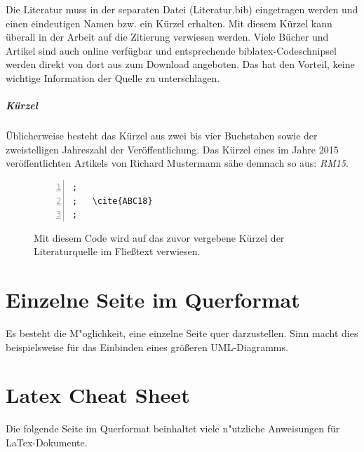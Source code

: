 Die Literatur muss in der separaten Datei (Literatur.bib) eingetragen werden und einen eindeutigen Namen bzw. ein Kürzel erhalten. Mit diesem Kürzel kann überall in der Arbeit auf die Zitierung verwiesen werden. Viele Bücher und Artikel sind auch online verfügbar und entsprechende biblatex-Codeschnipsel werden direkt von dort aus zum Download angeboten. Das hat den Vorteil, keine wichtige Information der Quelle zu unterschlagen.

\subparagraph{Kürzel}
Üblicherweise besteht das Kürzel aus zwei bis vier Buchstaben sowie der zweistelligen Jahreszahl der Veröffentlichung. Das Kürzel eines im Jahre 2015 veröffentlichten Artikels von Richard Mustermann sähe demnach so aus: \textit{RM15}.

\FloatBarrier
\begin{figure}[htb]
\begin{lstlisting}[backgroundcolor={\color{white}},
basicstyle={\normalsize\sffamily},
breaklines=true,
frame={bottomline,topline, rightline},
language=HTML,
numbers=left,
showstringspaces=false,
xleftmargin=22pt]	
;
;	\cite{ABC18}
;           
\end{lstlisting}
  \caption[Einbinden einer Literaturquelle]{Mit diesem Code wird auf das zuvor vergebene Kürzel der Literaturquelle im Fließtext verwiesen.}
\label{lst:literaturenquelle}
\end{figure}


\begin{landscape}


\section{Einzelne Seite im Querformat}
\label{sec:Querformat}

Es besteht die M"oglichkeit, eine einzelne Seite quer darzustellen. Sinn macht dies beispielsweise für das Einbinden eines größeren UML-Diagramms.

\section{Latex Cheat Sheet}
\label{sec:latexCheatsheet}

Die folgende Seite im Querformat beinhaltet viele n"utzliche Anweisungen für LaTex-Dokumente.

\end{landscape}

 



\cleardoublepage
